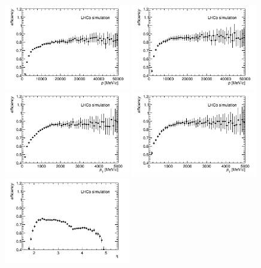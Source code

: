 \begin{figure}[tbph]
\begin{center}
\includegraphics[width = 0.49\textwidth]{figures/EffPatLLT/overall/BJpsiKSP_TBTC.png}
\includegraphics[width = 0.49\textwidth]{figures/EffPatLLT/overall/BJpsiKSFromBDP_TBTC.png}
\includegraphics[width = 0.49\textwidth]{figures/EffPatLLT/overall/BJpsiKSPt_TBTC.png}
\includegraphics[width = 0.49\textwidth]{figures/EffPatLLT/overall/BJpsiKSFromBDPt_TBTC.png}
\includegraphics[width = 0.49\textwidth]{figures/EffPatLLT/overall/BJpsiKSEta_TBTC.png}

\end{center}
\end{figure}

